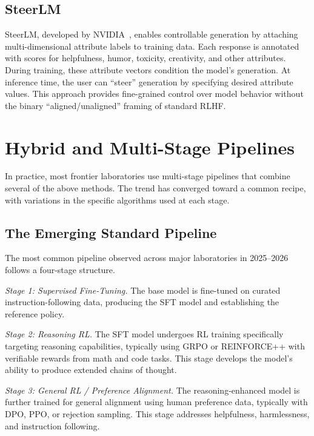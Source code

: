 \documentclass[12pt]{article}
\begin{document}
\subsection{SteerLM}

SteerLM, developed by NVIDIA~\cite{Wang2024SteerLM}, enables controllable generation by attaching multi-dimensional attribute labels to training data. Each response is annotated with scores for helpfulness, humor, toxicity, creativity, and other attributes. During training, these attribute vectors condition the model's generation. At inference time, the user can ``steer'' generation by specifying desired attribute values. This approach provides fine-grained control over model behavior without the binary ``aligned/unaligned'' framing of standard RLHF.


\section{Hybrid and Multi-Stage Pipelines}

In practice, most frontier laboratories use multi-stage pipelines that combine several of the above methods. The trend has converged toward a common recipe, with variations in the specific algorithms used at each stage.

\subsection{The Emerging Standard Pipeline}

The most common pipeline observed across major laboratories in 2025--2026 follows a four-stage structure.

\textit{Stage 1: Supervised Fine-Tuning.} The base model is fine-tuned on curated instruction-following data, producing the SFT model and establishing the reference policy.

\textit{Stage 2: Reasoning RL.} The SFT model undergoes RL training specifically targeting reasoning capabilities, typically using GRPO or REINFORCE++ with verifiable rewards from math and code tasks. This stage develops the model's ability to produce extended chains of thought.

\textit{Stage 3: General RL / Preference Alignment.} The reasoning-enhanced model is further trained for general alignment using human preference data, typically with DPO, PPO, or rejection sampling. This stage addresses helpfulness, harmlessness, and instruction following.
\end{document}
